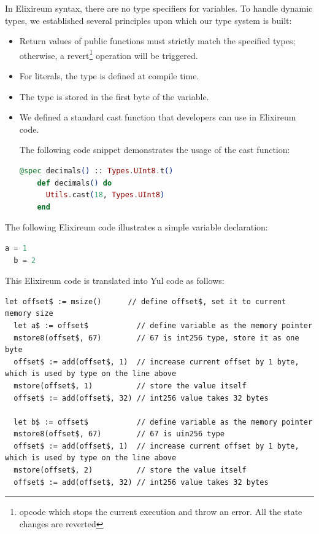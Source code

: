 In Elixireum syntax, there are no type specifiers for variables. To handle dynamic types, we established several principles upon which our type system is built:
\begin{itemize}
  \item Return values of public functions must strictly match the specified types; otherwise, a revert\footnote{opcode which stops the current execution and throw an error. All the state changes are reverted} operation will be triggered.
  \item For literals, the type is defined at compile time.
  \item The type is stored in the first byte of the variable.
  \item We defined a standard cast function that developers can use in Elixireum code.

  The following code snippet demonstrates the usage of the cast function:
  \begin{lstlisting}[caption={Example of cast function usage}, language=elixir, label={lst:contract_structure}]
    @spec decimals() :: Types.UInt8.t()
    def decimals() do
      Utils.cast(18, Types.UInt8)
    end  
  \end{lstlisting}
\end{itemize}

The following Elixireum code illustrates a simple variable declaration:

\begin{lstlisting}[caption={Elixireum code for simple case}, language=elixir]
  a = 1
  b = 2
\end{lstlisting}

This Elixireum code is translated into Yul code as follows:

\begin{lstlisting}[caption={Generated yul code for simple case}, language=yul]
  let offset$ := msize()      // define offset$, set it to current memory size 
  let a$ := offset$           // define variable as the memory pointer
  mstore8(offset$, 67)        // 67 is int256 type, store it as one byte
  offset$ := add(offset$, 1)  // increase current offset by 1 byte, which is used by type on the line above
  mstore(offset$, 1)          // store the value itself
  offset$ := add(offset$, 32) // int256 value takes 32 bytes

  let b$ := offset$           // define variable as the memory pointer
  mstore8(offset$, 67)        // 67 is uin256 type
  offset$ := add(offset$, 1)  // increase current offset by 1 byte, which is used by type on the line above
  mstore(offset$, 2)          // store the value itself
  offset$ := add(offset$, 32) // int256 value takes 32 bytes
\end{lstlisting}

